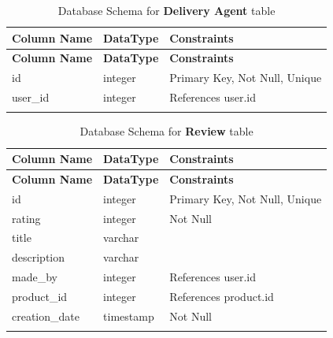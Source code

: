 \documentclass[12pt]{report}
\begin{document}
\begin{longtable}[H]{|l|l|p{6.5cm}||}
	\hline
	\textbf{Column Name} & \textbf{DataType} & \textbf{Constraints}          \\
	\hline
	\endfirsthead
	\hline
	\textbf{Column Name} & \textbf{DataType} & \textbf{Constraints}          \\
	\hline
	\endhead
	id                   & integer           & Primary Key, Not Null, Unique \\
	\hline
	user\_id             & integer           & References user.id            \\
	\hline
	\hline
	\caption{Database Schema for \textbf{Delivery Agent} table}\label{tab:tableDeliveryAgent}
\end{longtable}

\begin{longtable}[H]{|l|l|p{6.5cm}||}
	\hline
	\textbf{Column Name} & \textbf{DataType} & \textbf{Constraints}          \\
	\hline
	\endfirsthead
	\hline
	\textbf{Column Name} & \textbf{DataType} & \textbf{Constraints}          \\
	\hline
	\endhead
	id                   & integer           & Primary Key, Not Null, Unique \\
	\hline
	rating               & integer           & Not Null                      \\
	\hline
	title                & varchar           &                               \\
	\hline
	description          & varchar           &                               \\
	\hline
	made\_by             & integer           & References user.id            \\
	\hline
	product\_id          & integer           & References product.id         \\
	\hline
	creation\_date       & timestamp         & Not Null                      \\
	\hline
	\hline
	\caption{Database Schema for \textbf{Review} table}\label{tab:tableReview}
\end{longtable}
\end{document}

